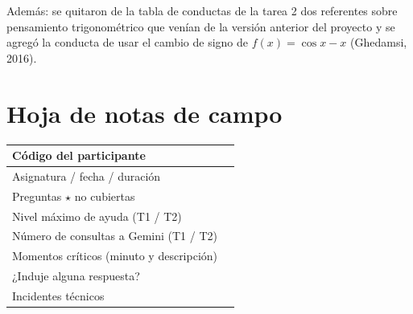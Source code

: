 \documentclass[11pt,letterpaper]{article}
\begin{document}
\noindent Además: se quitaron de la tabla de conductas de la tarea 2 dos referentes sobre pensamiento trigonométrico que venían de la versión anterior del proyecto y se agregó la conducta de usar el cambio de signo de $f(x)=\cos x - x$ (Ghedamsi, 2016).

\section{Hoja de notas de campo}\label{sec:notas}

\begin{center}
\renewcommand{\arraystretch}{1.9}
\begin{tabularx}{\linewidth}{|p{4.8cm}|X|}
\hline
Código del participante & \\ \hline
Asignatura / fecha / duración & \\ \hline
Preguntas $\star$ no cubiertas & \\ \hline
Nivel máximo de ayuda (T1 / T2) & \\ \hline
Número de consultas a Gemini (T1 / T2) & \\ \hline
Momentos críticos (minuto y descripción) & \\[1.2cm] \hline
¿Induje alguna respuesta? & \\[0.8cm] \hline
Incidentes técnicos & \\ \hline
\end{tabularx}
\end{center}

\end{document}
